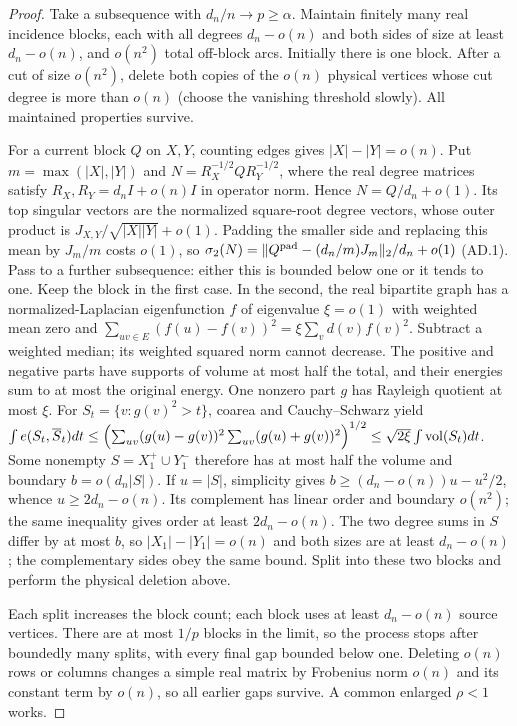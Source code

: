 \begin{proof}
Take a subsequence with $d_n/n\to{}p\ge\alpha$. Maintain finitely many real incidence blocks, each with all degrees $d_n-o(n)$ and both sides of size at least $d_n-o(n)$, and $o(n^2)$ total off-block arcs. Initially there is one block. After a cut of size $o(n^2)$, delete both copies of the $o(n)$ physical vertices whose cut degree is more than $o(n)$ (choose the vanishing threshold slowly). All maintained properties survive.

For a current block $Q$ on $X,Y$, counting edges gives $|X|-|Y|=o(n)$. Put $m=\max(|X|,|Y|)$ and $N=R_X^{-1/2}QR_Y^{-1/2}$, where the real degree matrices satisfy $R_X,R_Y=d_nI+o(n)I$ in operator norm. Hence $N=Q/d_n+o(1)$. Its top singular vectors are the normalized square-root degree vectors, whose outer product is $J_{X,Y}/\sqrt{|X||Y|}+o(1)$. Padding the smaller side and replacing this mean by $J_m/m$ costs $o(1)$, so $\sigma_2(N)=\|Q^{\rm{}pad}-(d_n/m)J_m\|_2/d_n+o(1)$ \textup{(AD.1)}. Pass to a further subsequence: either this is bounded below one or it tends to one. Keep the block in the first case. In the second, the real bipartite graph has a normalized-Laplacian eigenfunction $f$ of eigenvalue $\xi=o(1)$ with weighted mean zero and $\sum_{uv\in{}E}(f(u)-f(v))^2=\xi\sum_vd(v)f(v)^2$. Subtract a weighted median; its weighted squared norm cannot decrease. The positive and negative parts have supports of volume at most half the total, and their energies sum to at most the original energy. One nonzero part $g$ has Rayleigh quotient at most $\xi$. For $S_t=\{v:g(v)^2>t\}$, coarea and Cauchy--Schwarz yield $\int{}e(S_t,\overline{S}_t)dt\le\Bigl(\sum_{uv}(g(u)-g(v))^2\sum_{uv}(g(u)+g(v))^2\Bigr)^{1/2}\le\sqrt{2\xi}\int\operatorname{vol}(S_t)dt$. Some nonempty $S=X_1^+\cup{}Y_1^-$ therefore has at most half the volume and boundary $b=o(d_n|S|)$. If $u=|S|$, simplicity gives $b\ge(d_n-o(n))u-u^2/2$, whence $u\ge2d_n-o(n)$. Its complement has linear order and boundary $o(n^2)$; the same inequality gives order at least $2d_n-o(n)$. The two degree sums in $S$ differ by at most $b$, so $|X_1|-|Y_1|=o(n)$ and both sizes are at least $d_n-o(n)$; the complementary sides obey the same bound. Split into these two blocks and perform the physical deletion above.

Each split increases the block count; each block uses at least $d_n-o(n)$ source vertices. There are at most $1/p$ blocks in the limit, so the process stops after boundedly many splits, with every final gap bounded below one. Deleting $o(n)$ rows or columns changes a simple real matrix by Frobenius norm $o(n)$ and its constant term by $o(n)$, so all earlier gaps survive. A common enlarged $\rho<1$ works.


\end{proof}
